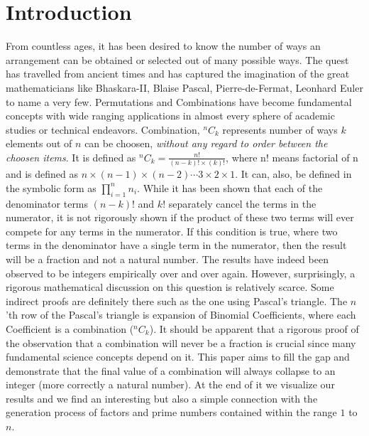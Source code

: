 \documentclass[12pt, twoside]{article}
\newcommand*{\Combination}[2]{{}^{#1}C_{#2}}%
\begin{document}
	\section{Introduction}
	From countless ages, it has been desired to know the number of ways an arrangement can be obtained or selected out of many possible ways. The quest has travelled from ancient times and has captured the imagination of the great mathematicians like Bhaskara-II\cite{wikipediaCombinatorics}, Blaise Pascal\cite{wikipediaPascal}, Pierre-de-Fermat\cite{wikipediaFermat}, Leonhard Euler\cite{wikipediaEuler} to name a very few.\newline	
	Permutations and Combinations have become fundamental concepts with wide ranging applications in almost every sphere of academic studies or technical endeavors.
	Combination, $\Combination{n}{k}$ represents number of ways $k$ elements out of $n$ can be choosen, \textit{without any regard to order between the choosen items}. It is defined as $\Combination{n}{k} = \frac{n!}{(n-k)!\times(k)!}$, where n! means factorial of n and is defined as $n\times(n-1)\times(n-2)\cdots3\times2\times1$. It can, also, be defined in the symbolic form as $\displaystyle\prod_{i=1}^{n} n_{i}$. While it has been shown that each of the denominator terms $(n-k)!$ and $k!$ separately cancel the terms in the numerator, it is not rigorously shown if the product of these two terms will ever compete for any terms in the numerator. If this condition is true, where two terms in the denominator have a single term in the numerator, then the result will be a fraction and not a natural number. The results have indeed been observed to be integers empirically over and over again. However, surprisingly, a rigorous mathematical discussion on this question is relatively scarce. Some indirect proofs are definitely there such as the one using Pascal's triangle. The $n$'th  row of the Pascal's triangle is expansion of Binomial Coefficients, where each Coefficient is a combination ($\Combination{n}{k}$). It should be apparent that a rigorous proof of the observation that a combination will never be a fraction is crucial since many fundamental science concepts depend on it.\newline
	This paper aims to fill the gap and demonstrate that the final value of a combination will always collapse to an integer (more correctly a natural number). At the end of it we visualize our results and we find an interesting but also a simple connection with the generation process of factors and prime numbers contained within the range $1$ to $n$.
\end{document}
